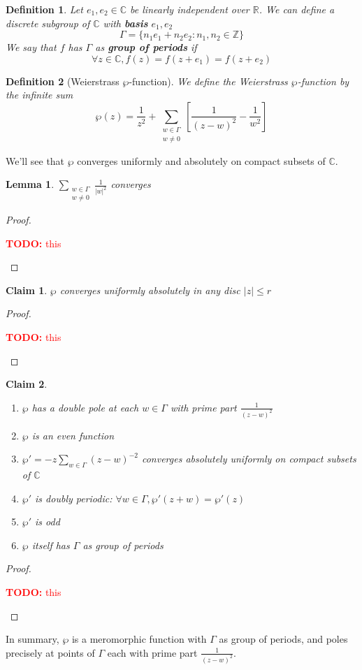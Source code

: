 \documentclass{article}
\newtheorem{lemma}{Lemma}
\newtheorem*{claim}{Claim}
\newcommand{\mbb}[1]{\mathbb{#1}}
\newtheorem{definition}{Definition}
\newcommand{\TODO}[1]{\begin{center}\huge{\textcolor{red}{\textbf{TODO:} #1}}\end{center}}
\begin{document}
\begin{definition}
Let \(e_1, e_2 \in \mbb{C}\) be linearly independent over \(\mbb{R}\). We can define a discrete subgroup of \(\mbb{C}\) with \textbf{basis} \(e_1, e_2\)
\[\Gamma = \{n_1e_1 + n_2e_2 : n_1, n_2 \in \mbb{Z}\}\]
We say that \(f\) has \(\Gamma\) as \textbf{group of periods} if
\[\forall z \in \mbb{C}, f(z) = f(z + e_1) = f(z + e_2)\]
\end{definition}
\begin{definition}[Weierstrass \(\wp\)-function]
We define the Weierstrass \(\wp\)-function by the infinite sum
\[\wp(z) = \frac{1}{z^2} + \sum_{\substack{w \in \Gamma \\ w \neq 0}}\left[
  \frac{1}{(z - w)^2} - \frac{1}{w^2}
\right]\]
\end{definition}
We'll see that \(\wp\) converges uniformly and absolutely on compact subsets of \(\mbb{C}\).
\begin{lemma}
\(\sum_{\substack{w \in \Gamma \\ w \neq 0}}\frac{1}{|w|^2}\) converges
\end{lemma}
\begin{proof}
\TODO{this}
\end{proof}
\begin{claim}
\(\wp\) converges uniformly absolutely in any disc \(|z| \leq r\)
\end{claim}
\begin{proof}
\TODO{this}
\end{proof}
\begin{claim}
\begin{enumerate}
  \item \(\wp\) has a double pole at each \(w \in \Gamma\) with prime part \(\frac{1}{(z - w)^2}\)
  \item \(\wp\) is an even function
  \item \(\wp' = -z\sum_{w \in \Gamma}(z - w)^{-2}\) converges absolutely uniformly on compact subsets of \(\mbb{C}\)
  \item \(\wp'\) is doubly periodic: \(\forall w \in \Gamma, \wp'(z + w) = \wp'(z)\)
  \item \(\wp'\) is odd
  \item \(\wp\) itself has \(\Gamma\) as group of periods
\end{enumerate}
\end{claim}
\begin{proof}
\TODO{this}
\end{proof}
In summary, \(\wp\) is a meromorphic function with \(\Gamma\) as group of periods, and poles precisely at points of \(\Gamma\) each with prime part \(\frac{1}{(z - w)^2}\).
\end{document}
